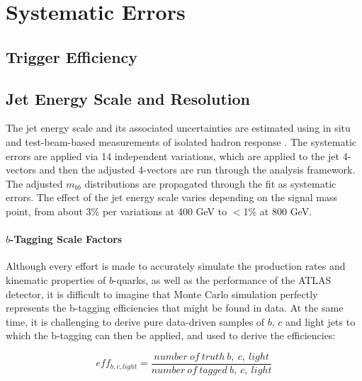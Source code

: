  

\chapter[Systematic Errors]{Systematic Errors}

\section{Trigger Efficiency}
\label{sec:trigger_syst}


\section{Jet Energy Scale and Resolution}
\label{sec:jes}
The jet energy scale and its associated uncertainties are estimated using
in situ and test-beam-based measurements of isolated hadron response \cite{jes}.  The systematic
errors are applied via 14 independent variations, which are applied to the jet
4-vectors and then the adjusted 4-vectors are run through the analysis framework.
The adjusted $m_{bb}$ distributions are propagated through the fit as systematic
errors.  The effect of the jet energy scale varies depending on the signal mass
point, from about 3\% per variations at 400 GeV to $<$1\% at 800 GeV.


%

\subsubsection{$b$-Tagging Scale Factors}
\label{sec:SF}
Although every effort is made to accurately simulate the production rates and
kinematic properties of $b$-quarks, as well as the performance of the ATLAS
detector, it is difficult to imagine that Monte Carlo simulation perfectly represents
the b-tagging efficiencies that might be found in data.  At the same time, it
is challenging to derive pure data-driven samples of $b$, $c$ and light jets to which
the b-tagging can then be applied, and used to derive the efficiencies:

    \begin{equation}
        eff_{b,c,light}=\frac{number\ of\ truth\ b,\ c,\ light}{number\ of\ tagged\ b,\ c,\ light}
    \end{equation}

